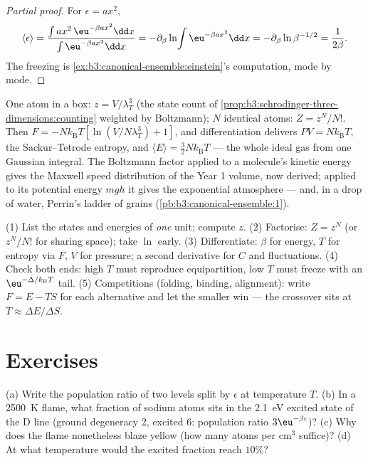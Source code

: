 \begin{proof}[Partial proof]
For $\epsilon = ax^2$,
\[
\langle\epsilon\rangle
 = \frac{\int ax^2\,\eu^{-\beta ax^2}\dd x}
        {\int\eu^{-\beta ax^2}\dd x}
 = -\partial_\beta\ln\!\int\eu^{-\beta ax^2}\dd x
 = -\partial_\beta\ln\beta^{-1/2} = \frac{1}{2\beta} .
\] The freezing is
\cref{ex:b3:canonical-ensemble:einstein}'s computation, mode by
mode.
\end{proof}

\begin{example}\label{ex:b3:canonical-ensemble:gas}
One atom in a box: $z = V/\lambda_T^3$ (the state count of
\cref{prop:b3:schrodinger-three-dimensions:counting} weighted by
Boltzmann); $N$ identical atoms: $Z = z^N/N!$. Then $F =
-Nk_{\text{B}}T[\ln(V/N\lambda_T^3) + 1]$, and differentiation
delivers $PV = Nk_{\text{B}}T$, the Sackur--Tetrode entropy, and
$\langle E\rangle = \tfrac32 Nk_{\text{B}}T$ --- the whole ideal gas
from one Gaussian integral. The Boltzmann factor applied to a
molecule's kinetic energy gives the Maxwell speed distribution of
the Year 1 volume, now derived; applied to its potential energy
$mgh$ it gives the exponential atmosphere --- and, in a drop of
water, Perrin's ladder of grains
(\cref{pb:b3:canonical-ensemble:1}).
\end{example}

\begin{method}\label{met:b3:canonical-ensemble:method}
(1) List the states and energies of \emph{one} unit; compute $z$.
(2) Factorise: $Z = z^N$ (or $z^N/N!$ for 
sharing space); take $\ln$ early. (3) Differentiate: $\beta$ for
energy, $T$ for entropy via $F$, $V$ for pressure; a second
derivative for $C$ and fluctuations. (4) Check both ends: high $T$
must reproduce equipartition, low $T$ must freeze with an
$\eu^{-\Delta/k_{\text{B}}T}$ tail. (5) Competitions (folding,
binding, alignment): write $F = E - TS$ for each alternative and
let the smaller win --- the crossover sits at $T \approx \Delta
E/\Delta S$.
\end{method}

\section{Exercises}

\begin{exercise}[$\star$]\label{exo:b3:canonical-ensemble:1}
(a) Write the population ratio of two levels split by $\epsilon$ at
temperature $T$. (b) In a \qty{2500}{K} flame, what fraction of
sodium atoms sits in the \qty{2.1}{eV} excited state of the D line
(ground degeneracy 2, excited 6: population ratio
$3\eu^{-\beta\epsilon}$)?
(c) Why does the flame nonetheless blaze yellow (how many atoms per
cm$^3$ suffice)? (d) At what temperature would the excited fraction
reach $10\%$?
\end{exercise}

